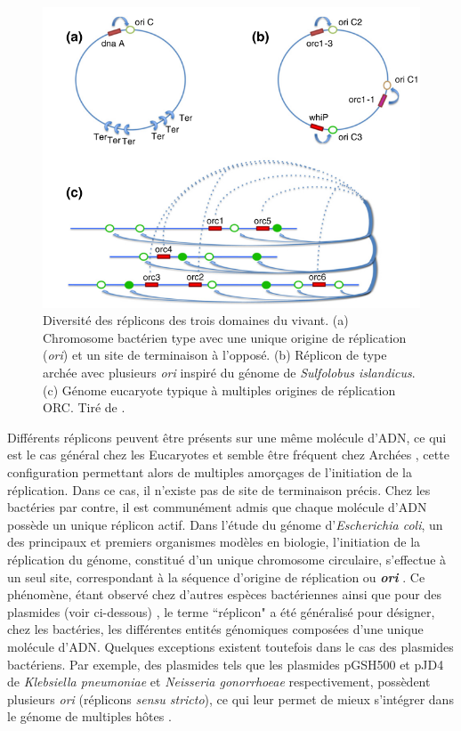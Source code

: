 \begin{figure}[H]
	\begin{center}
	\includegraphics[height=0.4\textheight]{./img/replicon_diversification.png}
	\caption[Diversité des réplicons des trois domaines du vivant]{Diversité des réplicons des trois domaines du vivant. (a) Chromosome bactérien type avec une unique origine de réplication (\textit{ori}) et un site de terminaison à l'opposé. (b) Réplicon de type archée avec plusieurs \textit{ori} inspiré du génome de \textit{Sulfolobus islandicus}. (c) Génome eucaryote typique à multiples origines de réplication ORC. Tiré de \citep{hyrien2013simple}.}\label{figreplintro}
	 \end{center}
 \end{figure} 

	Différents réplicons peuvent être présents sur une même molécule d'ADN, ce qui est le cas général chez les Eucaryotes et semble être fréquent chez Archées \citep{samson2011cell}, cette configuration permettant alors de multiples amorçages de l'initiation de la réplication. Dans ce cas, il n'existe pas de site de terminaison précis. Chez les bactéries par contre, il est communément admis que chaque molécule d'ADN possède un unique réplicon actif.
Dans l'étude du génome d'\textit{Escherichia coli}, un des principaux et premiers organismes modèles en biologie, l'initiation de la réplication du génome, constitué d'un unique chromosome circulaire, s'effectue à un seul site, correspondant à la séquence d'origine de réplication ou \textbf{\textit{ori}} \citep{skarstad1986timing}. Ce phénomène, étant observé chez d'autres espèces bactériennes ainsi que pour des plasmides (voir ci-dessous) \citep{Messer2002,worning2006origin}, le terme ``réplicon" a été généralisé pour désigner, chez les bactéries, les différentes entités génomiques composées d'une unique molécule d'ADN. Quelques exceptions existent toutefois dans le cas des plasmides bactériens. Par exemple, des plasmides tels que les plasmides pGSH500 et pJD4 de \textit{Klebsiella pneumoniae} et \textit{Neisseria gonorrhoeae} respectivement, possèdent plusieurs \textit{ori} (réplicons \textit{sensu stricto}), ce qui leur permet de mieux s'intégrer dans le génome de multiples hôtes \citep{Toukdarian2004}.
 
